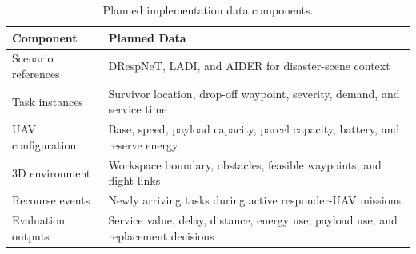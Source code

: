 \begin{table}[htbp]
\centering
\caption{Planned implementation data components.}
\label{tab:implementation_components}
\begin{tabular}{p{}p{}}
\hline
\textbf{Component} & \textbf{Planned Data}\\
\hline
Scenario references & DRespNeT, LADI, and AIDER for disaster-scene context\\
Task instances & Survivor location, drop-off waypoint, severity, demand, and service time\\
UAV configuration & Base, speed, payload capacity, parcel capacity, battery, and reserve energy\\
3D environment & Workspace boundary, obstacles, feasible waypoints, and flight links\\
Recourse events & Newly arriving tasks during active responder-UAV missions\\
Evaluation outputs & Service value, delay, distance, energy use, payload use, and replacement decisions\\
\hline
\end{tabular}
\end{table}
